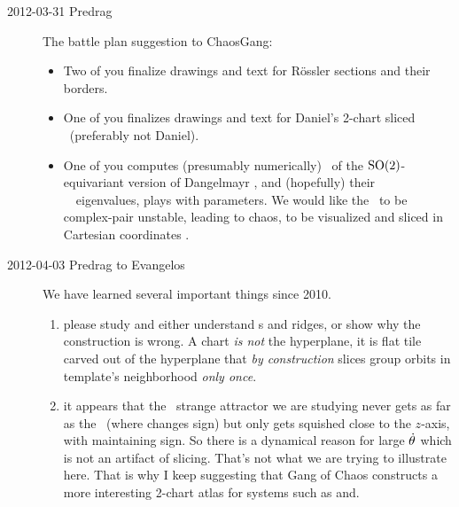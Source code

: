 \begin{description}
%
%

\item[2012-03-31 Predrag] The battle plan suggestion to ChaosGang:
\begin{itemize}
  \item
        Two of you finalize drawings and text for R\"ossler sections and
        their borders.
  \item
        One of you finalizes drawings and text for Daniel's 2-chart
        sliced \cLe\ (preferably not Daniel).
  \item
        One of you computes (presumably numerically) \reqva\ of the
        $\textrm{SO}(2)$-equivariant version of Dangelmayr {\twoMode}
        , and (hopefully) their \stabmat\ \Mvar\
        eigenvalues, plays with parameters. We would like the \reqva\ to
        be complex-pair unstable, leading to chaos, to be visualized and
        sliced in Cartesian coordinates \refeq{eq:AGH}.
\end{itemize}

\item[2012-04-03 Predrag to Evangelos] We have learned several important things since
2010.
\begin{enumerate}
  \item
    please study and either understand \chartBord s and ridges, or show
    why the construction is wrong. A chart \emph{is not} the hyperplane,
    it is flat tile carved out of the hyperplane that \emph{by construction}
    slices group orbits in template's neighborhood \emph{only once}.
  \item
    it appears that the \cLe\ strange attractor we are studying never
    gets as far as the \chartBord\ (where  changes
    sign) but only gets squished close to the $z$-axis, with
    \refeq{sliceSingl0} maintaining sign. So there is a dynamical reason
    for large $\dot{\theta}$ which is not an artifact of slicing. That's
    not what we are trying to illustrate here. That is why I keep
    suggesting that Gang of Chaos constructs a more interesting 2-chart
    atlas for {\twoMode} systems such as \refeq{eq:AGH} and.
\end{enumerate}


\end{description}

